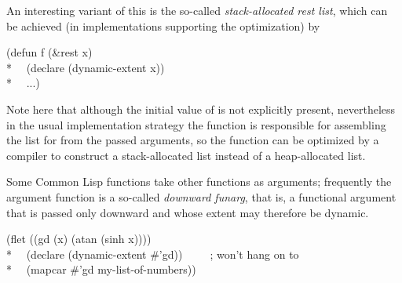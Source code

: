 \begin{newer}
\begin{flushdesc}
  An interesting variant of this is the so-called \emph{stack-allocated rest list},
  which can be achieved (in implementations supporting the optimization) by
\begin{lisp}
(defun f (\&rest x) \\*
~~(declare (dynamic-extent x)) \\*
~~...)
\end{lisp}
  Note here that although the initial value of  is not explicitly present,
  nevertheless in the usual implementation strategy the
  function  is responsible for assembling the list for  from the passed arguments,
  so the  function can be optimized by a compiler to construct a 
  stack-allocated list instead of a heap-allocated list.

Some Common Lisp functions take other functions as arguments; frequently
the argument function is a so-called \emph{downward funarg}, that is, a functional
argument that is passed only downward and whose extent may therefore be dynamic.
\begin{lisp}
(flet ((gd (x) (atan (sinh x)))) \\*
~~(declare (dynamic-extent \#'gd))~~~~~;{\rm {} won't hang on to }\\*
~~(mapcar \#'gd my-list-of-numbers))
\end{lisp}



\end{flushdesc}
\end{newer}
